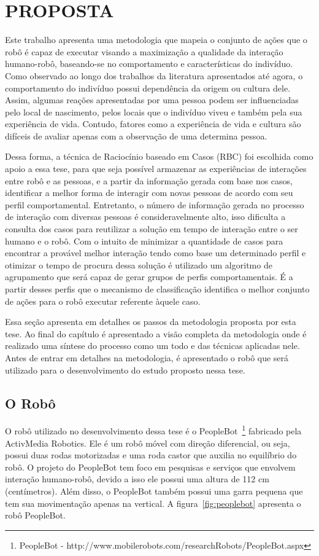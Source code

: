 \chapter{PROPOSTA}
\label{cap:proposta}

Este trabalho apresenta uma metodologia que mapeia o conjunto de ações que o robô é capaz de executar visando a maximização a qualidade da interação humano-robô, baseando-se no comportamento e características do indivíduo. Como observado ao longo dos trabalhos da literatura apresentados até agora, o comportamento do indivíduo possui dependência da origem ou cultura dele. Assim, algumas reações apresentadas por uma pessoa podem ser influenciadas pelo local de nascimento, pelos locais que o indivíduo viveu e também pela sua experiência de vida. Contudo, fatores como a experiência de vida e cultura são difíceis de avaliar apenas com a observação de uma determina pessoa.

Dessa forma, a técnica de Raciocínio baseado em Casos (RBC) foi escolhida como apoio a essa tese, para que seja possível armazenar as experiências de interações entre robô e as pessoas, e a partir da informação gerada com base nos casos, identificar a melhor forma de interagir com novas pessoas de acordo com seu perfil comportamental. Entretanto, o número de informação gerada no processo de interação com diversas pessoas é consideravelmente alto, isso dificulta a consulta dos casos para reutilizar a solução em tempo de interação entre o ser humano e o robô. Com o intuito de minimizar a quantidade de casos para encontrar a provável melhor interação tendo como base um determinado perfil e otimizar o tempo de procura dessa solução é utilizado um algoritmo de agrupamento que será capaz de gerar grupos de perfis comportamentais. É a partir desses perfis que o mecanismo de classificação identifica o melhor conjunto de ações para o robô executar referente àquele caso. 

Essa seção apresenta em detalhes os passos da metodologia proposta por esta tese. Ao final do capítulo é apresentado a visão completa da metodologia onde é realizado uma síntese do processo como um todo e das técnicas aplicadas nele. Antes de entrar em detalhes na metodologia, é apresentado o robô que será utilizado para o desenvolvimento do estudo proposto nessa tese.

\section{O Robô}
\label{sec:robo}
O robô utilizado no desenvolvimento dessa tese é o PeopleBot~\footnote{PeopleBot - http://www.mobilerobots.com/researchRobots/PeopleBot.aspx} fabricado pela ActivMedia Robotics. Ele é um robô móvel com direção diferencial, ou seja, possui duas rodas motorizadas e uma roda castor que auxilia no equilíbrio do robô. O projeto do PeopleBot tem foco em pesquisas e serviços que envolvem interação humano-robô, devido a isso ele possui uma altura de 112 cm (centímetros). Além disso, o PeopleBot também possui uma garra pequena que tem sua movimentação apenas na vertical. A figura~\ref{fig:peoplebot} apresenta o robô PeopleBot.

